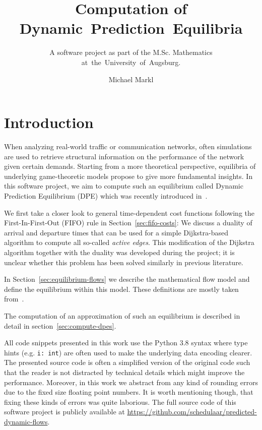 \documentclass[titlepage]{scrartcl}
\author{Michael Markl}
\title{Computation of Dynamic~Prediction~Equilibria}
\subtitle{A software project as part of the M.Sc. Mathematics at~the~University~of~Augsburg.}
\theoremstyle{definition}
\newcommand{\code}[1]{\texttt{#1}}
\begin{document}
    \maketitle

    \clearpage
    \tableofcontents

    \clearpage
    \section{Introduction}

    When analyzing real-world traffic or communication networks, often simulations are used to retrieve structural information on the performance of the network given certain demands.
    Starting from a more theoretical perspective, equilibria of underlying game-theoretic models propose to give more fundamental insights.
    In this software project, we aim to compute such an equilibrium called Dynamic Prediction Equilibrium (DPE) which was recently introduced in~\cite{mainpaper}.

    We first take a closer look to general time-dependent cost functions following the First-In-First-Out (FIFO) rule in Section~\ref{sec:fifo-costs}:
    We discuss a duality of arrival and departure times that can be used for a simple Dijkstra-based algorithm to compute all so-called \emph{active edges}.
    This modification of the Dijkstra algorithm together with the duality was developed during the project; it is unclear whether this problem has been solved similarly in previous literature.
    
    In Section~\ref{sec:equilibrium-flows} we describe the mathematical flow model and define the equilibrium within this model.
    These definitions are mostly taken from~\cite{mainpaper}.

    The computation of an approximation of such an equilibrium is described in detail in section~\ref{sec:compute-dpes}.


    All code snippets presented in this work use the Python 3.8 syntax where type hints (e.g. \code{i: int}) are often used to make the underlying data encoding clearer.
    The presented source code is often a simplified version of the original code such that the reader is not distracted by technical details which might improve the performance.
    Moreover, in this work we abstract from any kind of rounding errors due to the fixed size floating point numbers.
    It is worth mentioning though, that fixing these kinds of errors was quite laborious. 
    The full source code of this software project is publicly available at \url{https://github.com/schedulaar/predicted-dynamic-flows}.
\end{document}
